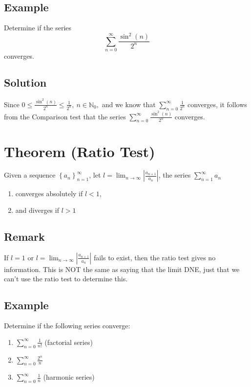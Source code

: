 \documentclass[11pt]{article}
\newcommand{\naturals}{\mathbb{N}}
\begin{document}
\subsection{Example}
Determine if the series
$$\sum_{n=0}^\infty \frac{\sin^2(n)}{2^n}$$
converges.

\subsection{Solution}
Since $\displaystyle{0 \leq \frac{\sin^2(n)}{2^n} \leq \frac{1}{2^n},\ n \in \naturals_0,}$ and we know that $\displaystyle{\sum_{n=0}^\infty \frac{1}{2^n}}$ converges, it follows from the Comparison test that the series $\displaystyle{\sum_{n=0}^\infty \frac{\sin^2(n)}{2^n}}$ converges.

\section{Theorem (Ratio Test)}
Given a sequence $\left\{ a_n \right\}_{n=1}^\infty$, let $\displaystyle{l = \lim_{n\rightarrow\infty} \left| \frac{a_{n+1}}{a_n}\right|}$, the series $\displaystyle{\sum_{n=1}^\infty a_n}$
\begin{enumerate}[ (i) ]
\item converges absolutely if $l < 1$,
\item and diverges if $l > 1$
\end{enumerate}

\subsection{Remark}
If $l = 1$ or $\displaystyle{l = \lim_{n\rightarrow\infty} \left| \frac{a_{n+1}}{a_n}\right|}$ fails to exist, then the ratio test gives no information. This is NOT the same as saying that the limit DNE, just that we can't use the ratio test to determine this.

\subsection{Example}
Determine if the following series converge:
\begin{enumerate}[ (a) ]
\item $\displaystyle{\sum_{n=0}^\infty \frac{1}{n!}}$ (factorial series)

\item $\displaystyle{\sum_{n=0}^\infty \frac{2^n}{n}}$

\item $\displaystyle{\sum_{n=0}^\infty \frac{1}{n}}$ (harmonic series)
\end{enumerate}
\end{document}

